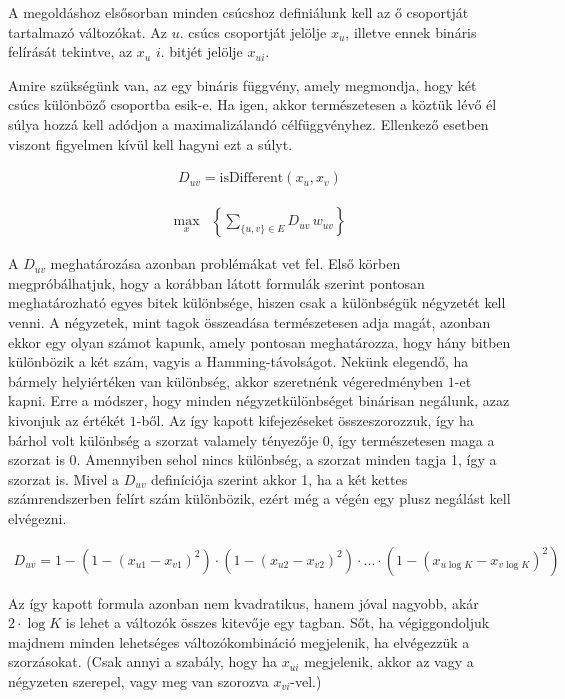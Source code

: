A megoldáshoz elsősorban minden csúcshoz definiálunk kell az ő csoportját tartalmazó változókat. Az $u.$ csúcs csoportját jelölje $x_u$, illetve ennek bináris felírását tekintve, az $x_u$ $i.$ bitjét jelölje $x_{ui}$.

Amire szükségünk van, az egy bináris függvény, amely megmondja, hogy két csúcs különböző csoportba esik-e. Ha igen, akkor természetesen a köztük lévő él súlya hozzá kell adódjon a maximalizálandó célfüggvényhez. Ellenkező esetben viszont figyelmen kívül kell hagyni ezt a súlyt.

\begin{align}
D_{uv} = \text{isDifferent}(x_u,x_v)
\end{align}

\begin{align} 
	\max_{x} & \left\{\sum _{\{u,v\} \in E } D_{uv} \, w_{uv} \right\} 
\end{align}

A $D_{uv}$ meghatározása azonban problémákat vet fel. Első körben megpróbálhatjuk, hogy a korábban látott formulák szerint pontosan meghatározható egyes bitek különbsége, hiszen csak a különbségük négyzetét kell venni. A négyzetek, mint tagok összeadása természetesen adja magát, azonban ekkor egy olyan számot kapunk, amely pontosan meghatározza, hogy hány bitben különbözik a két szám, vagyis a Hamming-távolságot. Nekünk elegendő, ha bármely helyiértéken van különbség, akkor szeretnénk végeredményben $1$-et kapni. Erre a módszer, hogy minden négyzetkülönbséget binárisan negálunk, azaz kivonjuk az értékét $1$-ből. Az így kapott kifejezéseket összeszorozzuk, így ha bárhol volt különbség a szorzat valamely tényezője 0, így természetesen maga a szorzat is 0. Amennyiben sehol nincs különbség, a szorzat minden tagja 1, így a szorzat is. Mivel a $D_{uv}$ definíciója szerint akkor 1, ha a két kettes számrendszerben felírt szám különbözik, ezért még a végén egy plusz negálást kell elvégezni.

\begin{align}	
	D_{uv} = 1-  \left( 1-(x_{u1}-x_{v1})^2 \right) \cdot \left( 1-(x_{u2}-x_{v2})^2 \right) \cdot ...  \cdot \left( 1-(x_{u\log K}-x_{v \log K})^2 \right) 
\end{align}

Az így kapott formula azonban nem kvadratikus, hanem jóval nagyobb, akár $2 \cdot \log K$ is lehet a változók összes kitevője egy tagban. Sőt, ha végiggondoljuk majdnem minden lehetséges változókombináció megjelenik, ha elvégezzük a szorzásokat. (Csak annyi a szabály, hogy ha $x_{ui}$ megjelenik, akkor az vagy a négyzeten szerepel, vagy meg van szorozva $x_{vi}$-vel.)

